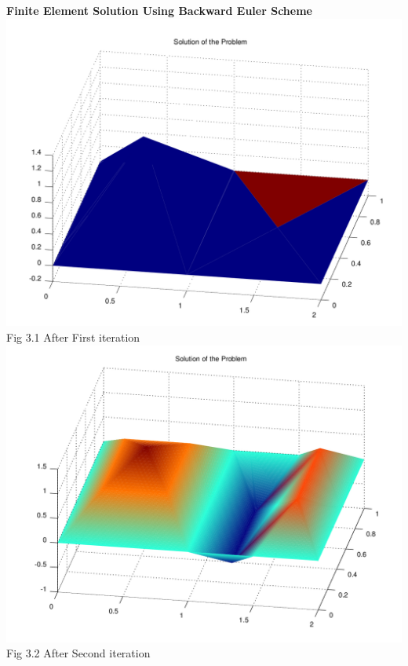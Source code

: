 \documentclass{report}
\numberwithin{equation}{chapter}
\begin{document}
\begin{center}
\textbf{Finite Element Solution Using Backward Euler Scheme}\\
\includegraphics[scale=0.25]{1}\hspace*{70cm}\\
{Fig 3.1 After First iteration}
\includegraphics[scale=0.6]{2}\hspace*{70cm}\\
{Fig 3.2 After Second iteration}

\end{center}
\end{document}

